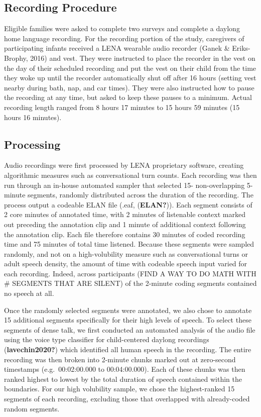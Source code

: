 \documentclass[
  man,floatsintext]{apa6}
\begin{document}
\hypertarget{recording-procedure}{%
\subsection{Recording Procedure}\label{recording-procedure}}

Eligible families were asked to complete two surveys and complete a daylong home language recording. For the recording portion of the study, caregivers of participating infants received a LENA wearable audio recorder (Ganek \& Eriks-Brophy, 2016) and vest. They were instructed to place the recorder in the vest on the day of their scheduled recording and put the vest on their child from the time they woke up until the recorder automatically shut off after 16 hours (setting vest nearby during bath, nap, and car times). They were also instructed how to pause the recording at any time, but asked to keep these pauses to a minimum. Actual recording length ranged from 8 hours 17 minutes to 15 hours 59 minutes (15 hours 16 minutes).

\hypertarget{processing}{%
\subsection{Processing}\label{processing}}

Audio recordings were first processed by LENA proprietary software, creating algorithmic measures such as conversational turn counts. Each recording was then run through an in-house automated sampler that selected 15- non-overlapping 5-minute segments, randomly distributed across the duration of the recording. The process output a codeable ELAN file (.eaf, (\textbf{ELAN?})). Each segment consists of 2 core minutes of annotated time, with 2 minutes of listenable context marked out preceding the annotation clip and 1 minute of additional context following the annotation clip. Each file therefore contains 30 minutes of coded recording time and 75 minutes of total time listened. Because these segments were sampled randomly, and not on a high-volubility measure such as conversational turns or adult speech density, the amount of time with codeable speech input varied for each recording. Indeed, across participants (FIND A WAY TO DO MATH WITH \# SEGMENTS THAT ARE SILENT) of the 2-minute coding segments contained no speech at all.

Once the randomly selected segments were annotated, we also chose to annotate 15 additional segments specifically for their high levels of speech. To select these segments of dense talk, we first conducted an automated analysis of the audio file using the voice type classifier for child-centered daylong recordings (\textbf{lavechin2020?}) which identified all human speech in the recording. The entire recording was then broken into 2-minute chunks marked out at zero-second timestamps (e.g.~00:02:00.000 to 00:04:00.000). Each of these chunks was then ranked highest to lowest by the total duration of speech contained within the boundaries. For our high volubility sample, we chose the highest-ranked 15 segments of each recording, excluding those that overlapped with already-coded random segments.
\end{document}
